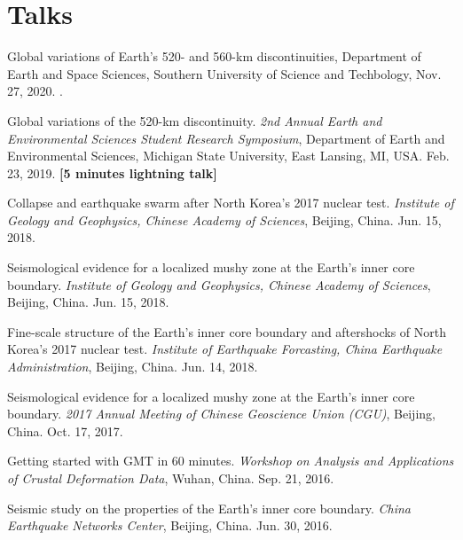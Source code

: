 \section*{Talks}
\begin{etaremune}
\item
	Global variations of Earth's 520- and 560-km discontinuities,
	Department of Earth and Space Sciences, Southern University of Science and Techbology,
	Nov. 27, 2020.
	\invited.
\item
    Global variations of the 520-km discontinuity.
    \textit{ 2nd Annual Earth and Environmental Sciences Student Research Symposium},
    Department of Earth and Environmental Sciences, Michigan State University, East Lansing, MI, USA.
    Feb. 23, 2019.
    \textbf{[5 minutes lightning talk]}
\item
    Collapse and earthquake swarm after North Korea's 2017 nuclear test.
    \textit{Institute of Geology and Geophysics, Chinese Academy of Sciences}, Beijing, China.
    Jun. 15, 2018.
\item
    Seismological evidence for a localized mushy zone at the Earth's inner core boundary.
    \textit{Institute of Geology and Geophysics, Chinese Academy of Sciences}, Beijing, China.
    Jun. 15, 2018.
    \invited
\item
    Fine-scale structure of the Earth's inner core boundary and aftershocks of North Korea's 2017 nuclear test.
    \textit{Institute of Earthquake Forcasting, China Earthquake Administration}, Beijing, China.
    Jun. 14, 2018.
\item
    Seismological evidence for a localized mushy zone at the Earth's inner core boundary.
    \textit{2017 Annual Meeting of Chinese Geoscience Union (CGU)}, Beijing, China.
    Oct. 17, 2017.
    \invited
\item
    Getting started with GMT in 60 minutes.
    \textit{Workshop on Analysis and Applications of Crustal Deformation Data}, Wuhan, China.
    Sep. 21, 2016.
    \invited
\item
    Seismic study on the properties of the Earth's inner core boundary.
    \textit{China Earthquake Networks Center}, Beijing, China.
    Jun. 30, 2016.
    \invited
\end{etaremune}
